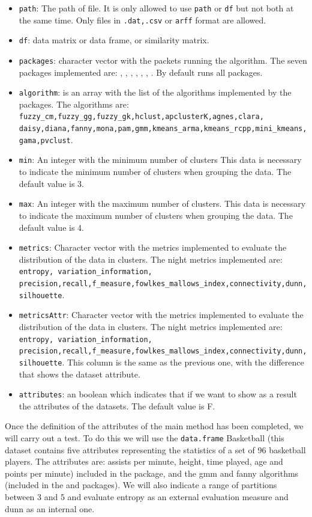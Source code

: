 \begin{itemize}
  \item \texttt{path}: The path of file. It is only allowed to use \texttt{path} or \texttt{df} but not both at the same time. Only files in \texttt{.dat,.csv} or \texttt{arff} format are allowed.
  \item \texttt{df}: data matrix or data frame, or similarity matrix.
  \item \texttt{packages}: character vector with the packets running the algorithm. The seven packages implemented are: , , , , , , . By default runs all packages.
  \item \texttt{algorithm}: is an array with the list of the algorithms implemented by the packages. The algorithms are: \texttt{fuzzy\_cm,fuzzy\_gg,fuzzy\_gk,hclust,apclusterK,agnes,clara,\\daisy,diana,fanny,mona,pam,gmm,kmeans\_arma,kmeans\_rcpp,mini\_kmeans,gama,pvclust}.
  \item \texttt{min}: An integer with the minimum number of clusters This data is necessary to indicate the minimum number of clusters when grouping the data. The default value is 3.
  \item \texttt{max}: An integer with the maximum number of clusters. This data is necessary to indicate the maximum number of clusters when grouping the data. The default value is 4.
  \item \texttt{metrics}: Character vector with the metrics implemented to evaluate the distribution of the data in clusters. The night metrics implemented are: \texttt{entropy, variation\_information, precision,recall,f\_measure,fowlkes\_mallows\_index,connectivity,dunn,silhouette}.
  \item \texttt{metricsAttr}: Character vector with the metrics implemented to evaluate the distribution of the data in clusters. The night metrics implemented are: \texttt{entropy, variation\_information, precision,recall,f\_measure,fowlkes\_mallows\_index,connectivity,dunn,silhouette}. This column is the same as the previous one, with the difference that shows the dataset attribute.
  \item \texttt{attributes}: an boolean which indicates that if we want to show as a result the attributes of the datasets. The default value is F.
\end{itemize}

Once the definition of the attributes of the main method has been completed, we will carry out a test. To do this we will use the \texttt{data.frame} Basketball (this dataset contains five attributes representing the statistics of a set of 96 basketball players. The attributes are: assists per minute, height, time played, age and points per minute) included in the package, and the gmm and fanny algorithms (included in the  and  packages). We will also indicate a range of partitions between 3 and 5 and evaluate entropy as an external evaluation measure and dunn as an internal one.

